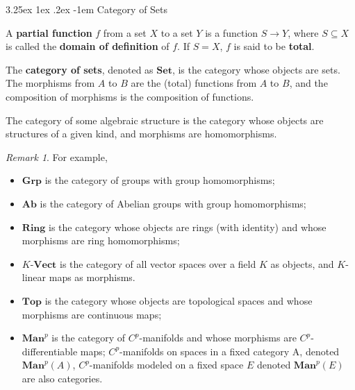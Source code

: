 \documentclass[12pt, letterpaper]{article}
\makeatletter
\renewcommand\subparagraph{\@startsection{subparagraph}{5}{\parindent}%
	{3.25ex \@plus1ex \@minus .2ex}%
	{0.75ex plus 0.1ex}%
	{\normalfont\normalsize\bfseries}}
\renewcommand\subparagraph{\@startsection{subparagraph}{5}{\parindent}%
	{3.25ex \@plus1ex \@minus .2ex}%
	{-1em}%
	{\normalfont\normalsize\bfseries}}
\theoremstyle{definition}
\theoremstyle{remark}
\newtheorem*{rem*}{Remark}
\theoremstyle{definition}
\theoremstyle{plain}
\numberwithin{equation}{section}
\makeatother
\begin{document}
	\subparagraph{Category of Sets}
	\begin{def*}
		A \textbf{partial function} $f$ from a set $X$ to a set $Y$
		is a function $S\to Y$,
		where $S\subseteq X$ is called the \textbf{domain of definition} of $f$.
		If $S=X$, $f$ is said to be \textbf{total}.
	\end{def*}
	\begin{def*}
		The \textbf{category of sets}, denoted as $\mathbf{Set}$,
		is the category whose objects are sets.
		The morphisms from $A$ to $B$ are the (total) functions from $A$ to $B$,
		and the composition of morphisms is the composition of functions.
	\end{def*}

	
	\begin{def*}
		The category of some algebraic structure is the category whose objects
		are structures of a given kind, and morphisms are homomorphisms.
	\end{def*}
	\begin{rem*}
		For example,
		\begin{itemize}
			\item $\mathbf{Grp}$ is the category of groups with group homomorphisms;
			\item $\mathbf{Ab}$ is the category of Abelian groups with group homomorphisms;
			\item $\mathbf{Ring}$ is the category whose objects are rings (with identity) and whose morphisms are ring homomorphisms;
			\item $K$-$\mathbf{Vect}$ is the category of all vector spaces over a field $K$ as objects,
			and $K$-linear maps as morphisms.
			\item $\mathbf{Top}$ is the category whose objects are topological spaces and whose morphisms are continuous maps;
			\item $\mathbf{Man}^p$
			is the category of $C^p$-manifolds and whose morphisms are $C^p$-differentiable maps;
			$C^p$-manifolds on spaces in a fixed category A, denoted $\mathbf{Man}^p(A)$,
			$C^p$-manifolds modeled on a fixed space $E$ denoted $\mathbf{Man}^p(E)$ are also categories.
		\end{itemize}
		
	\end{rem*}
\end{document}
